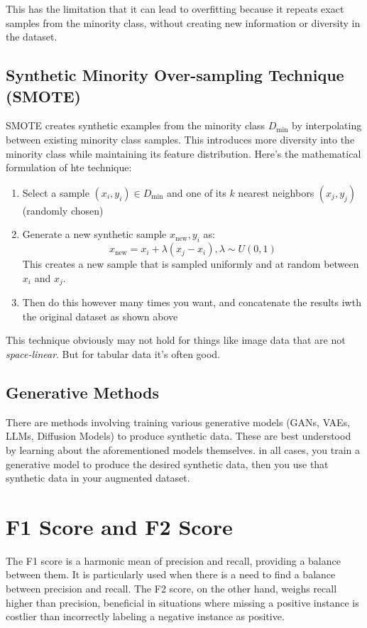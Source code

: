 \documentclass[12pt]{article}
\begin{document}
This has the limitation that it can lead to overfitting because it repeats exact samples from the minority class, without creating new information or diversity in the dataset.

\subsection{Synthetic Minority Over-sampling Technique (SMOTE)}
SMOTE creates synthetic examples from the minority class \(D_\text{min}\)  by interpolating between existing minority class samples. This introduces more diversity into the minority class while maintaining its feature distribution. Here's the mathematical formulation of hte technique:\\

\begin{enumerate}
\item Select a sample \((x_i, y_i) \in D_\text{min}\) and one of its \(k\) nearest neighbors \((x_j, y_j)\) (randomly chosen)
\item Generate a new synthetic sample \(x_\text{new}, y_i\) as:
\[x_\text{new} = x_i + \lambda(x_j - x_i), \lambda \sim U(0,1)\]
This creates a new sample that is sampled uniformly and at random between \(x_i\) and \(x_j\). 
\item Then do this however many times you want, and concatenate the results iwth the original dataset as shown above
\end{enumerate}
This technique obviously may not hold for things like image data that are not \emph{space-linear}. But for tabular data it's often good. 

\subsection{Generative Methods}
There are methods involving training various generative models (GANs, VAEs, LLMs, Diffusion Models) to produce synthetic data. These are best understood by learning about the aforementioned models themselves. in all cases,  you train a generative model to produce the desired synthetic data, then you use that synthetic data in your augmented dataset.

\section{F1 Score and F2 Score}

The F1 score is a harmonic mean of precision and recall, providing a balance between them. It is particularly used when there is a need to find a balance between precision and recall. The F2 score, on the other hand, weighs recall higher than precision, beneficial in situations where missing a positive instance is costlier than incorrectly labeling a negative instance as positive.
\end{document}
